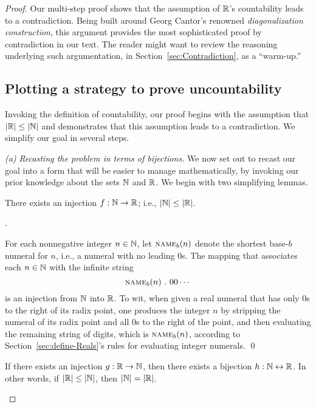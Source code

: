 \begin{proof}
Our multi-step proof shows that the assumption of $\mathbb{R}$'s countability
leads to a contradiction.  Being built around Georg Cantor's renowned
{\it diagonalization construction},  this
argument provides the most sophisticated proof by contradiction in our
text.  The reader might want to review the reasoning underlying such
argumentation, in Section~\ref{sec:Contradiction}, as a ``warm-up.''

\subsection{Plotting a strategy to prove uncountability}
\label{sec:the-diag-strategy}

Invoking the definition of countability, our proof begins with the
assumption that $|\mathbb{R}| \leq |\mathbb{N}|$ and demonstrates that this assumption
leads to a contradiction.  We simplify our goal in several steps.

{\it (a) Recasting the problem in terms of bijections.}
We now set out to recast our goal into a form that will be easier to
manage mathematically, by invoking our prior knowledge about the sets
$\mathbb{N}$ and $\mathbb{R}$.  We begin with two simplifying lemmas.

\begin{lemma}
\label{lem:N-leq-R}
There exists an injection $f: \mathbb{N} \rightarrow \mathbb{R}$; i.e., $|\mathbb{N}| \leq
|\mathbb{R}|$.
\end{lemma}

.

For each nonnegative integer $n \in \mathbb{N}$, let $\mbox{\sc name}_b(n)$
denote the shortest base-$b$ numeral for $n$, i.e., a numeral with no
leading $0$s.  The mapping that associates each $n \in \mathbb{N}$ with the
infinite string
\[ \mbox{\sc name}_b(n) \ . \ 00 \cdots \]
is an injection from $\mathbb{N}$ into $\mathbb{R}$.  To wit, when given a real
numeral that has only $0$s to the right of its radix point, one
produces the integer $n$ by stripping the numeral of its radix point
and all $0$s to the right of the point, and then evaluating the
remaining string of digits, which is $\mbox{\sc name}_b(n)$, according
to Section~\ref{sec:define-Reals}'s rules for evaluating integer
numerals.  \qed

\begin{lemma}
\label{lem:N-=-R}
If there exists an injection $g: \mathbb{R} \rightarrow \mathbb{N}$, then there exists
a bijection $h: \mathbb{N} \leftrightarrow \mathbb{R}$.  In other words, if $|\mathbb{R}| \leq
|\mathbb{N}|$, then $|\mathbb{N}| = |\mathbb{R}|$.
\end{lemma}


\end{proof}
